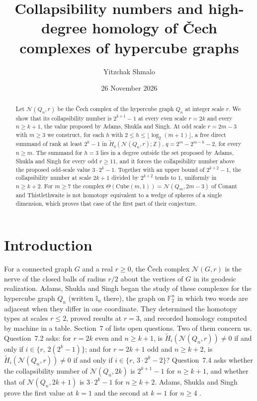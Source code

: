 \documentclass[11pt]{amsart}
\theoremstyle{definition}
\theoremstyle{remark}
\newcommand{\N}{\mathcal{N}}
\newcommand{\Q}{Q}
\newcommand{\F}{\mathbb{F}}
\newcommand{\Z}{\mathbb{Z}}
\newcommand{\Hred}{\widetilde{H}}
\begin{document}
\title[Collapsibility and homology of \v{C}ech complexes of cubes]{Collapsibility numbers and high-degree homology of
\v{C}ech complexes of hypercube graphs}
\author{Yitzchak Shmalo}
\date{26 November 2026}
\address{Einstein Institute of Mathematics, The Hebrew University of Jerusalem, Jerusalem, Israel}

\begin{abstract}
Let $\N(\Q_n,r)$ be the \v{C}ech complex of the hypercube graph $\Q_n$ at integer scale $r$. We show that its
collapsibility number is $2^{k+1}-1$ at every even scale $r=2k$ and every $n\ge k+1$, the value proposed by Adams,
Shukla and Singh. At odd scale $r=2m-3$ with $m\ge3$ we construct, for each $h$ with $2\le h\le\lfloor\log_2(m+1)\rfloor$,
a free direct summand of rank at least $2^h-1$ in $\Hred_{q}(\N(\Q_n,r);\Z)$, $q=2^m-2^{m-h}-2$, for every $n\ge m$. The
summand for $h=3$ lies in a degree outside the set proposed by Adams, Shukla and Singh for every odd $r\ge11$, and it
forces the collapsibility number above the proposed odd-scale value $3\cdot2^k-1$. Together with an upper bound of
$2^{k+2}-1$, the collapsibility number at scale $2k+1$ divided by $2^{k+2}$ tends to $1$, uniformly in $n\ge k+2$. For $m\ge7$ the complex $\Theta(\mathrm{Cube}(m,1))=\N(\Q_m,2m-3)$ of Conant and Thistlethwaite is not homotopy
equivalent to a wedge of spheres of a single dimension, which proves that case of the first part of their conjecture.
\end{abstract}

\maketitle

\section{Introduction}

For a connected graph $G$ and a real $r\ge0$, the \v{C}ech complex $\N(G,r)$ is the nerve of the closed balls of radius
$r/2$ about the vertices of $G$ in its geodesic realization. Adams, Shukla and Singh \cite{ASS} began the study of these
complexes for the hypercube graph $\Q_n$ (written $\mathbb{I}_n$ there), the graph on $\F_2^n$ in which two words are
adjacent when they differ in one coordinate. They determined the homotopy types at scales $r\le 2$, proved results at
$r=3$, and recorded homology computed by machine in a table. Section~7 of \cite{ASS} lists open questions. Two of them
concern us. Question~7.2 asks: for $r=2k$ even and $n\ge k+1$, is $\Hred_i(\N(\Q_n,r))\ne0$ if and only if
$i\in\{r,\,2(2^k-1)\}$; and for $r=2k+1$ odd and $n\ge k+2$, is $\Hred_i(\N(\Q_n,r))\ne0$ if and only if
$i\in\{r,\,3\cdot2^k-2\}$? Question~7.4 asks whether the collapsibility number of $\N(\Q_n,2k)$ is $2^{k+1}-1$ for
$n\ge k+1$, and whether that of $\N(\Q_n,2k+1)$ is $3\cdot2^k-1$ for $n\ge k+2$. Adams, Shukla and Singh prove the first
value at $k=1$ \cite[Lemma~7.3]{ASS} and the second at $k=1$ for $n\ge4$ \cite[Theorem~5.9]{ASS}.
\end{document}
